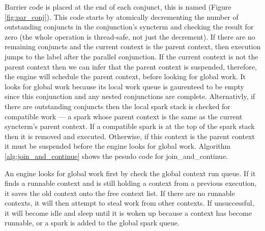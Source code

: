Barrier code is placed at the end of each conjunct,
this is named  (Figure \ref{fig:par_conj}).
This code starts by atomically decrementing the number of outstanding
conjuncts in the conjunction's syncterm and checking the result for zero
(the whole operation is thread-safe, not just the decrement).
If there are no remaining conjuncts and the current context is the parent
context,
then execution jumps to the label after the parallel conjunction.
If the current context is not the parent context then
we can infer that the parent context is suspended,
therefore, 
the engine will schedule the parent context, before looking for global work.
It looks for global work because its local work queue is gaurenteed to be
empty since this conjunction and any nested conjunctions are complete.
Alternativly, if there are outstanding conjuncts then
the local spark stack is checked for compatible work ---
a spark whose parent context is the same as the current syncterm's parent
context.
If a compatible spark is at the top of the spark stack then it is removed
and executed.
Otherwise,
if this context is the parent context it must be suspended
before the engine looks for global work.
Algorithm \ref{alg:join_and_continue} shows the pesudo code for
join\_and\_continue.

An engine looks for global work first by check the global context run queue.
If it finds a runnable context and is still holding a context from a
previous execution, it saves the old context onto the free context list.
If there are no runnable contexts,
it will then attempt to steal work from other contexts.
If unsuccessful, it will become idle and sleep
until it is woken up because a context has become runnable,
or a spark is added to the global spark queue.
